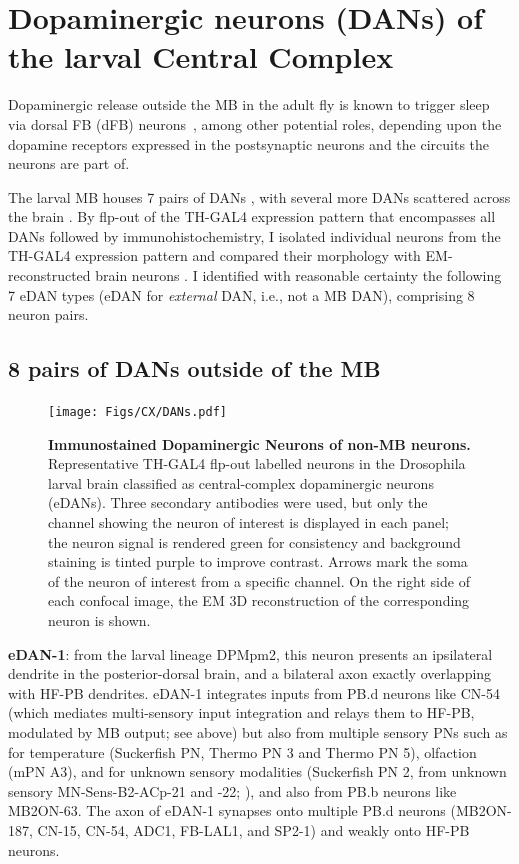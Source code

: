  \section{Dopaminergic neurons (DANs) of the larval Central Complex}
\label{CXDANs}
    Dopaminergic release outside the MB in the adult fly is known to trigger sleep via dorsal FB (dFB) neurons~\citep{pimentel2016sleep}, among other potential roles, depending upon the dopamine receptors expressed in the postsynaptic neurons and the circuits the neurons are part of. 

    The larval MB houses 7 pairs of DANs \citep{eichler2017complete}, with several more DANs scattered across the brain \citep{selcho2009thgal4}. By flp-out of the TH-GAL4 expression pattern that encompasses all DANs \citep{selcho2009thgal4} followed by immunohistochemistry, I isolated individual neurons from the TH-GAL4 expression pattern and compared their morphology with EM-reconstructed brain neurons \citep{winding2023connectome}. I identified with reasonable certainty the following 7 eDAN types (eDAN for \textit{external} DAN, i.e., not a MB DAN), comprising 8 neuron pairs.

    \subsection{8 pairs of DANs outside of the MB}

    \begin{figure}
        \centering
        \texttt{[image: Figs/CX/DANs.pdf]}
        \caption{\textbf{Immunostained Dopaminergic Neurons of non-MB neurons.}  Representative TH-GAL4 flp-out labelled neurons in the Drosophila larval brain classified as central-complex dopaminergic neurons (eDANs). Three secondary antibodies were used, but only the channel showing the neuron of interest is displayed in each panel; the neuron signal is rendered green for consistency and background staining is tinted purple to improve contrast. Arrows mark the soma of the neuron of interest from a specific channel. On the right side of each confocal image,  the EM 3D reconstruction of the corresponding neuron is shown. }
        \label{DANs}
    \end{figure}
    


    \textbf{eDAN-1}: from the larval lineage DPMpm2, this neuron presents an ipsilateral dendrite in the posterior-dorsal brain, and a bilateral axon exactly overlapping with HF-PB dendrites. eDAN-1 integrates inputs from PB.d neurons like CN-54 (which mediates multi-sensory input integration and relays them to HF-PB, modulated by MB output; see above) but also from multiple sensory PNs such as for temperature (Suckerfish PN, Thermo PN 3 and Thermo PN 5), olfaction (mPN A3), and for unknown sensory modalities (Suckerfish PN 2, from unknown sensory MN-Sens-B2-ACp-21 and -22; \citep{miroschnikow2018convergence}), and also from PB.b neurons like MB2ON-63. The axon of eDAN-1 synapses onto multiple PB.d neurons (MB2ON-187, CN-15, CN-54, ADC1, FB-LAL1, and SP2-1) and weakly onto HF-PB neurons.

